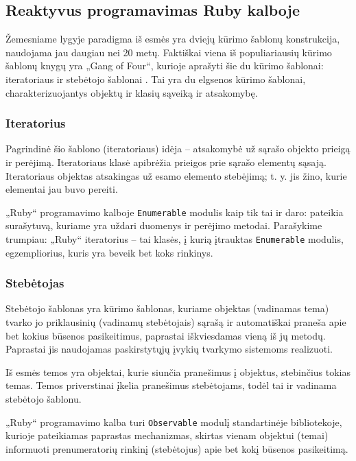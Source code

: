 \subsection{Reaktyvus programavimas Ruby kalboje}

Žemesniame lygyje paradigma iš esmės yra dviejų kūrimo šablonų konstrukcija, naudojama jau daugiau nei 20 metų. Faktiškai viena iš populiariausių kūrimo šablonų knygų yra „Gang of Four“, kurioje aprašyti šie du kūrimo šablonai: iteratoriaus ir stebėtojo šablonai \cite{GOF:DesignPattern}. Tai yra du elgsenos kūrimo šablonai, charakterizuojantys objektų ir klasių sąveiką ir atsakomybę.

\subsubsection{Iteratorius}

Pagrindinė šio šablono (iteratoriaus) idėja – atsakomybė už sąrašo objekto prieigą ir perėjimą. Iteratoriaus klasė apibrėžia prieigos prie sąrašo elementų sąsają. Iteratoriaus objektas atsakingas už esamo elemento stebėjimą; t. y. jis žino, kurie elementai jau buvo pereiti.

„Ruby“ programavimo kalboje \lstinline|Enumerable| modulis kaip tik tai ir daro: pateikia surašytuvą, kuriame yra uždari duomenys ir perėjimo metodai. Parašykime trumpiau: „Ruby“ iteratorius – tai klasės, į kurią įtrauktas \lstinline|Enumerable| modulis, egzempliorius, kuris yra beveik bet koks rinkinys.

\subsubsection{Stebėtojas}

Stebėtojo šablonas yra kūrimo šablonas, kuriame objektas (vadinamas tema) tvarko jo priklausinių (vadinamų stebėtojais) sąrašą ir automatiškai praneša apie bet kokius būsenos pasikeitimus, paprastai iškviesdamas vieną iš jų metodų. Paprastai jis naudojamas paskirstytųjų įvykių tvarkymo sistemoms realizuoti.

Iš esmės temos yra objektai, kurie siunčia pranešimus į objektus, stebinčius tokias temas. Temos priverstinai įkelia pranešimus stebėtojams, todėl tai ir vadinama stebėtojo šablonu.

„Ruby“ programavimo kalba turi \lstinline|Observable| modulį standartinėje bibliotekoje, kurioje pateikiamas paprastas mechanizmas, skirtas vienam objektui (temai) informuoti prenumeratorių rinkinį (stebėtojus) apie bet kokį būsenos pasikeitimą.

